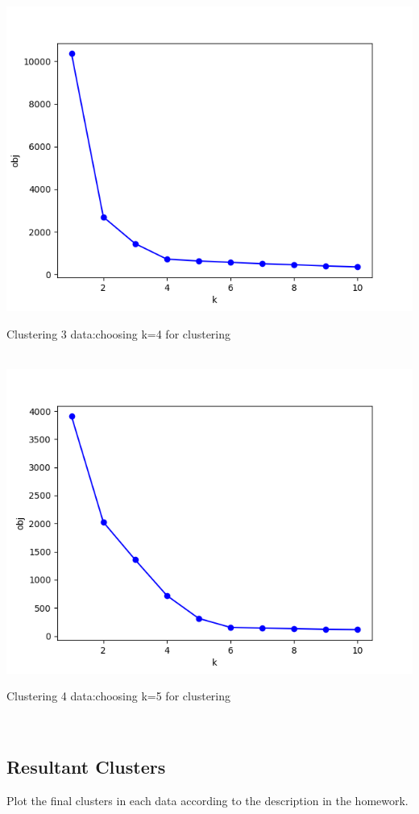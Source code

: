 \documentclass{article}
\begin{document}
\includegraphics[width=\linewidth]{clustering_images/clustering3obj.png}
\centerline{Clustering 3 data:choosing k=4 for clustering}\\
\includegraphics[width=\linewidth]{clustering_images/clustering4obj.png}
\centerline{Clustering 4 data:choosing k=5 for clustering}\\



\subsection{Resultant Clusters}
Plot the final clusters in each data according to the description in the homework.\\
\end{document}
